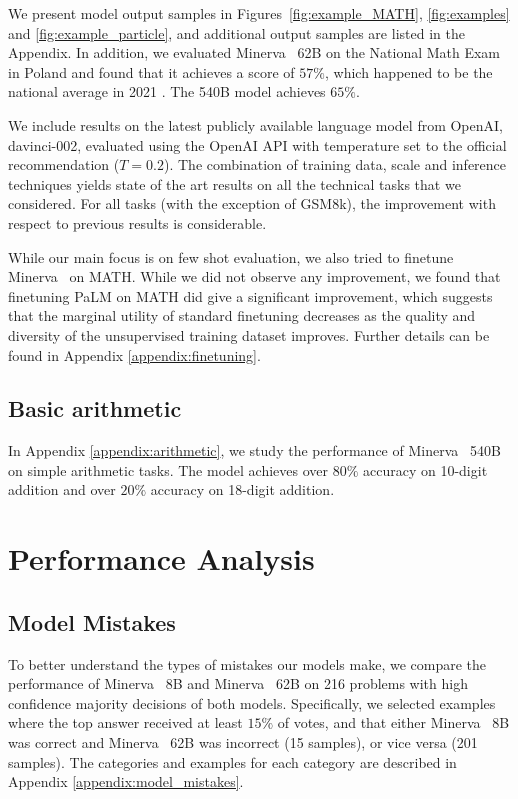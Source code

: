 We present model output samples in Figures~\ref{fig:example_MATH}, \ref{fig:examples} and \ref{fig:example_particle}, and additional output samples are listed in the Appendix. In addition, we evaluated {Minerva~} 62B on the National Math Exam in Poland and found that it achieves a score of $57\%$, which happened to be the national average in 2021 \citep[p.~23]{cke_results}. The 540B model achieves $65\%$.

We include results on the latest publicly available language model from OpenAI, davinci-002, evaluated using the OpenAI API with temperature set to the official recommendation ($T=0.2$). The combination of training data, scale and inference techniques yields state of the art results on all the technical tasks that we considered. For all tasks (with the exception of GSM8k), the improvement with respect to previous results is considerable.

While our main focus is on few shot evaluation,  we also tried to finetune {Minerva~} on MATH. While we did not observe any improvement, we found that finetuning {PaLM } on MATH did give a significant  improvement, which suggests that the marginal utility of standard finetuning decreases as the quality and diversity of the unsupervised training dataset improves. Further details can be found in Appendix \ref{appendix:finetuning}. 

\subsection{Basic arithmetic} In Appendix \ref{appendix:arithmetic}, we study the performance of {Minerva~} 540B on simple arithmetic tasks. The model achieves over $80\%$ accuracy on 10-digit addition and over $20\%$ accuracy on 18-digit addition.  

\section{Performance Analysis}

\subsection{Model Mistakes}
\label{sec:mistake_exploration}

To better understand the types of mistakes our models make, we compare the performance of {Minerva~} 8B and {Minerva~} 62B on 216 problems with high confidence majority decisions of both models. Specifically, we selected examples where the top answer received at least $15\%$ of votes, and that either {Minerva~} 8B was correct and {Minerva~} 62B was incorrect (15 samples), or vice versa (201 samples). The categories and examples for each category are described in Appendix \ref{appendix:model_mistakes}.

